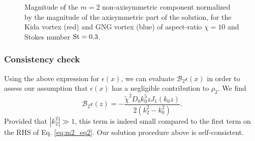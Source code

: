 \documentclass[apj]{emulateapj}
\newcommand{\Eq}[1]{Eq. (\ref{#1})}
\newcommand{\eq}[1]{\Eq{#1}}
\newcommand{\beq}{\begin{equation}}
\newcommand{\eeq}{\end{equation}}
\begin{document}
\begin{figure}
  \begin{center}
  \end{center}
  \caption[]{Magnitude of the $m=2$ non-axisymmetric component normalized by the magnitude of the axisymmetric part of the solution, for the Kida vortex (red) and GNG vortex (blue) of aspect-ratio $\chi=10$ and Stokes number $\rm{St}=0.3$. }
 \label{fig:nonaxi}
\end{figure}



\subsubsection{Consistency check}
Using the above expression for $\epsilon(x)$, we can evaluate
$\mathcal{B}_2\epsilon(x)$ in order to assess our assumption that
$\epsilon(x)$ has a negligible contribution to $\rho_2$. We find
\beq
\mathcal{B}_2\epsilon(z) =
-\frac{\tilde{\chi}^2D_0k_0^5zJ_1(k_0z)}{2\left(k_2^2 -
  k_0^2\right)}. 
\eeq
Provided that $|k_2^2|\gg1$, this term is indeed small compared to the
first term on the RHS of Eq. \ref{eq:m2_eq2}.
Our solution procedure above is self-consistent.  

\end{document}
